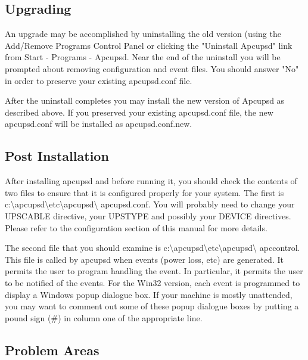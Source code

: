 {{{{{{{\label{Upgrading}
\subsection*{Upgrading}

An upgrade may be accomplished by uninstalling the old version (using
the Add/Remove Programs Control Panel or clicking the "Uninstall Apcupsd" 
link from Start -\gt{} Programs -\gt{} Apcupsd. Near the end of the
uninstall you will be prompted about removing configuration and event
files. You should answer "No" in order to preserve your existing
apcupsd.conf file.

After the uninstall completes you may install the new version of
Apcupsd as described above. If you preserved your existing apcupsd.conf
file, the new apcupsd.conf will be installed as apcupsd.conf.new.

\label{Post-Installation}
\subsection*{Post Installation}

\label{index-Windows_002c-Post-Installation-177}
After installing apcupsd and before running it, you should check the contents
of two files to ensure that it is configured properly for your system. The
first is
c:\textbackslash{}apcupsd\textbackslash{}etc\textbackslash{}apcupsd\textbackslash
{}apcupsd.conf. You will probably need to change your UPSCABLE directive, your
UPSTYPE and possibly your DEVICE directives. Please refer to the configuration
section of this manual for more details.  

The second file that you should examine is
c:\textbackslash{}apcupsd\textbackslash{}etc\textbackslash{}apcupsd\textbackslash
{}apccontrol. This file is called by apcupsd when events (power loss, etc) are
generated. It permits the user to program handling the event. In particular,
it permits the user to be notified of the events. For the Win32 version, each
event is programmed to display a Windows popup dialogue box. If your machine
is mostly unattended, you may want to comment out some of these popup dialogue
boxes by putting a pound sign (\#) in column one of the appropriate line. 

\label{Problem-Areas}

\subsection*{Problem Areas}

}}}}}}}
